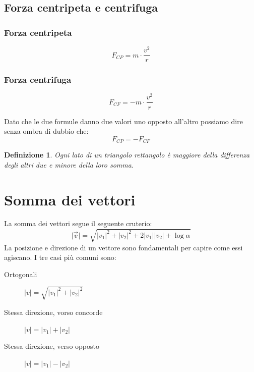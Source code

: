 \documentclass{book}
\newcommand{\abs}[1]{\lvert#1\rvert}
\newtheorem{defi}{Definizione}[section]
\begin{document}
\subsection{Forza centripeta e centrifuga}
\label{sec:forzcentecentr}

\begin{multicols}{2}
  \subsubsection{Forza centripeta}
  \label{sec:forzacent}
  \begin{equation}
    \label{eq:forzacent}
    F_{CP}=m\cdot \frac{v^2}{r}
  \end{equation}
  
  \subsubsection{Forza centrifuga}
  \label{sec:forzacentrifuga}
  \begin{equation}
    \label{eq:forzacentrifuga}
    F_{CF}=-m\cdot\frac{v^2}{r}
  \end{equation}
\end{multicols}
Dato che le due formule danno due valori uno opposto all'altro possiamo dire senza ombra di dubbio che:
\begin{equation}
  \label{eq:equalscrcrnt}
  \boxed{F_{CP}=-F_{CF}}
\end{equation}
\begin{defi}
  Ogni lato di un triangolo rettangolo è maggiore della differenza degli altri due e minore della loro somma.
\end{defi}

\section{Somma dei vettori}
\label{sec:sommavect}
La somma dei vettori segue il seguente cruterio:
\begin{equation}
  \label{eq:sommavect}
  \abs{\vec{v}}=\sqrt{\abs{v_1}^2+\abs{v_2}^2+2\abs{v_1}\abs{v_2}+\log \alpha}
\end{equation}
La posizione e direzione di un vettore sono fondamentali per capire come essi agiscano. I tre casi più comuni sono:
\begin{description}
\item[Ortogonali] $\abs{v}=\sqrt{\abs{v_1}^2+\abs{v_2}^2}$
\item[Stessa direzione, vorso concorde] $\abs{v}=\abs{v_1}+\abs{v_2}$
\item[Stessa direzione, verso opposto] $\abs{v}=\abs{v_1}-\abs{v_2}$
\end{description}
\end{document}

